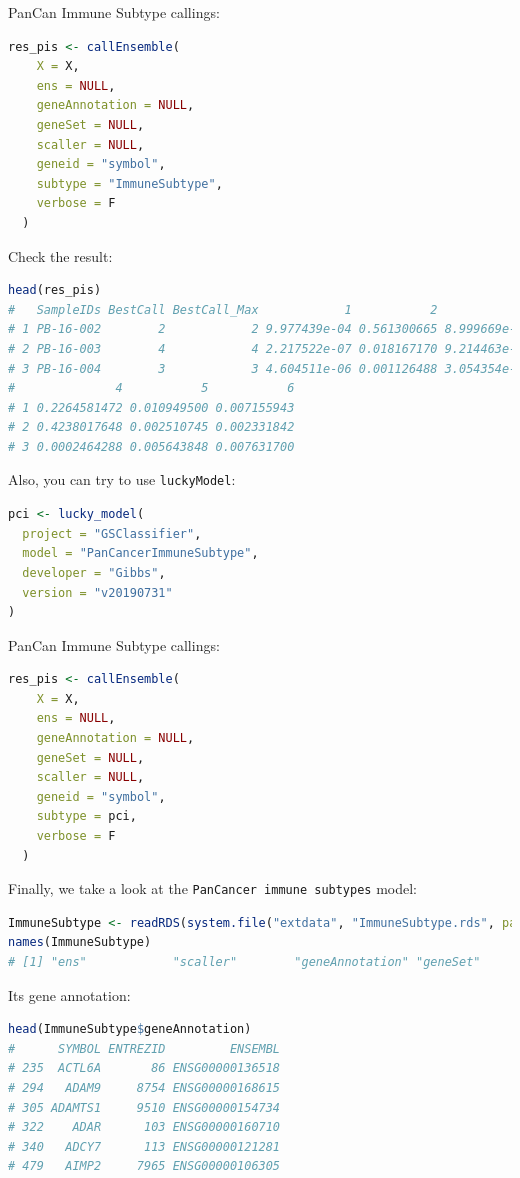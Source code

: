 \documentclass[
  12pt,
]{book}
\newcommand{\passthrough}[1]{#1}
\begin{document}
PanCan Immune Subtype callings:

\begin{lstlisting}[language=R]
res_pis <- callEnsemble(
    X = X,
    ens = NULL,
    geneAnnotation = NULL,
    geneSet = NULL,
    scaller = NULL,
    geneid = "symbol",
    subtype = "ImmuneSubtype",
    verbose = F
  )
\end{lstlisting}

Check the result:

\begin{lstlisting}[language=R]
head(res_pis)
#   SampleIDs BestCall BestCall_Max            1           2            3
# 1 PB-16-002        2            2 9.977439e-04 0.561300665 8.999669e-06
# 2 PB-16-003        4            4 2.217522e-07 0.018167170 9.214463e-05
# 3 PB-16-004        3            3 4.604511e-06 0.001126488 3.054354e-01
#              4           5           6
# 1 0.2264581472 0.010949500 0.007155943
# 2 0.4238017648 0.002510745 0.002331842
# 3 0.0002464288 0.005643848 0.007631700
\end{lstlisting}

Also, you can try to use \passthrough{\lstinline!luckyModel!}:

\begin{lstlisting}[language=R]
pci <- lucky_model(
  project = "GSClassifier",
  model = "PanCancerImmuneSubtype",
  developer = "Gibbs",
  version = "v20190731"
)
\end{lstlisting}

PanCan Immune Subtype callings:

\begin{lstlisting}[language=R]
res_pis <- callEnsemble(
    X = X,
    ens = NULL,
    geneAnnotation = NULL,
    geneSet = NULL,
    scaller = NULL,
    geneid = "symbol",
    subtype = pci,
    verbose = F
  )
\end{lstlisting}

Finally, we take a look at the \passthrough{\lstinline!PanCancer immune subtypes!} model:

\begin{lstlisting}[language=R]
ImmuneSubtype <- readRDS(system.file("extdata", "ImmuneSubtype.rds", package = "GSClassifier"))
names(ImmuneSubtype)
# [1] "ens"            "scaller"        "geneAnnotation" "geneSet"
\end{lstlisting}

Its gene annotation:

\begin{lstlisting}[language=R]
head(ImmuneSubtype$geneAnnotation)
#      SYMBOL ENTREZID         ENSEMBL
# 235  ACTL6A       86 ENSG00000136518
# 294   ADAM9     8754 ENSG00000168615
# 305 ADAMTS1     9510 ENSG00000154734
# 322    ADAR      103 ENSG00000160710
# 340   ADCY7      113 ENSG00000121281
# 479   AIMP2     7965 ENSG00000106305
\end{lstlisting}
\end{document}
